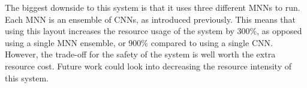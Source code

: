 The biggest downside to this system is that it uses three different \acp{MNN} to run.
Each \ac{MNN} is an ensemble of \acp{CNN}, as introduced previously.
This means that using this layout increases the resource usage of the system by 300\%, as opposed using a single \ac{MNN} ensemble, or 900\% compared to using a single \ac{CNN}.
However, the trade-off for the safety of the system is well worth the extra resource cost.
Future work could look into decreasing the resource intensity of this system.


